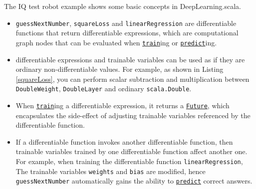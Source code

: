 The IQ test robot example shows some basic concepts in DeepLearning.scala.

\begin{itemize}
  \item \lstinline{guessNextNumber}, \lstinline{squareLoss} and \lstinline{linearRegression} are \glspl{differentiable function} that return \glspl{differentiable expression}, which are computational graph nodes that can be evaluated when \href{https://javadoc.io/page/com.thoughtworks.deeplearning/deeplearning_2.11/latest/com/thoughtworks/deeplearning/DeepLearning.html\#train(differentiable:Differentiable)(implicitmonoid:algebra.ring.MultiplicativeMonoid[DeepLearning.this.Delta]):com.thoughtworks.future.Future[DeepLearning.this.Data]}{\lstinline{train}}ing or \href{https://javadoc.io/page/com.thoughtworks.deeplearning/deeplearning_2.11/latest/com/thoughtworks/deeplearning/DeepLearning.html\#predict(differentiable:Differentiable):com.thoughtworks.future.Future[DeepLearning.this.Data]}{\lstinline{predict}}ing.
  \item \Glspl{differentiable expression} and \glspl{trainable variable} can be used as if they are ordinary non-differentiable values. For example, as shown in Listing \ref{squareLoss}, you can perform scalar subtraction and multiplication between \lstinline{DoubleWeight}, \lstinline{DoubleLayer} and ordinary \lstinline{scala.Double}.
  \item When \href{https://javadoc.io/page/com.thoughtworks.deeplearning/deeplearning_2.11/latest/com/thoughtworks/deeplearning/DeepLearning.html\#train(differentiable:Differentiable)(implicitmonoid:algebra.ring.MultiplicativeMonoid[DeepLearning.this.Delta]):com.thoughtworks.future.Future[DeepLearning.this.Data]}{\lstinline{train}}ing a \gls{differentiable expression}, it returns a \href{https://javadoc.io/page/com.thoughtworks.future/future_2.11/latest/com/thoughtworks/future$$Future.html}{\lstinline{Future}}, which encapsulates the side-effect of adjusting \glspl{trainable variable} referenced by the \gls{differentiable function}.
  \item If a \gls{differentiable function} invokes another \gls{differentiable function}, then \glspl{trainable variable} trained by one \gls{differentiable function} affect another one. For example, when training the \gls{differentiable function} \lstinline{linearRegression}, The \glspl{trainable variable} \lstinline{weights} and \lstinline{bias} are modified, hence \lstinline{guessNextNumber} automatically gains the ability to \href{https://javadoc.io/page/com.thoughtworks.deeplearning/deeplearning_2.11/latest/com/thoughtworks/deeplearning/DeepLearning.html\#predict(differentiable:Differentiable):com.thoughtworks.future.Future[DeepLearning.this.Data]}{\lstinline{predict}} correct answers.
\end{itemize}

